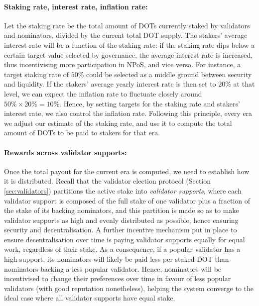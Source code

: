 \paragraph{Staking rate, interest rate, inflation rate:} Let the staking rate be the total amount of DOTs 
currently staked by validators and nominators, divided by the current total DOT supply. 
The stakers' average interest rate will be a function of the staking rate: 
if the staking rate dips below a certain target value selected by governance, 
the average interest rate is increased, thus incentivising more participation in NPoS, and vice versa. 
For instance, a target staking rate of $50\%$ could be selected as a middle ground between security and liquidity. 
If the stakers' average yearly interest rate is then set to $20\%$ at that level, 
we can expect the inflation rate to fluctuate closely around $50\%\times 20\% = 10\%$. 
Hence, by setting targets for the staking rate and stakers' interest rate, we also control the inflation rate. 
Following this principle, every era we adjust our estimate of the staking rate, 
and use it to compute the total amount of DOTs to be paid to stakers for that era.

\paragraph{Rewards across validator supports:} 
Once the total payout for the current era is computed, we need to establish how it is distributed.
Recall that the validator election protocol (Section \ref{sec:validators}) partitions the active stake into 
\emph{validator supports}, where each validator support is composed of the full stake of one validator 
plus a fraction of the stake of its backing nominators, and this partition is made so as to make validator supports 
as high and evenly distributed as possible, hence ensuring security and decentralisation. 
A further incentive mechanism put in place to ensure decentralisation over time 
is paying validator supports equally for equal work, regardless of their stake. 
As a consequence, if a popular validator has a high support, its nominators will likely be paid less per staked DOT 
than nominators backing a less popular validator. Hence, nominators will be incentivised to change their preferences 
over time in favour of less popular validators (with good reputation nonetheless), helping the system converge to the ideal case where all validator supports have equal stake.

